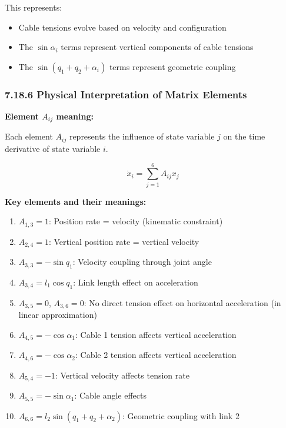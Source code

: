This represents:
\begin{itemize}
    \item Cable tensions evolve based on velocity and configuration
    \item The $\sin \alpha_i$ terms represent vertical components of cable tensions
    \item The $\sin(q_1+q_2+\alpha_i)$ terms represent geometric coupling
\end{itemize}

\subsubsection{7.18.6 Physical Interpretation of Matrix Elements}

\textbf{Element $A_{ij}$ meaning:}

Each element $A_{ij}$ represents the influence of state variable $j$ on the time derivative of state variable $i$.

\begin{equation}
\dot{x}_i = \sum_{j=1}^{6} A_{ij} x_j
\end{equation}

\textbf{Key elements and their meanings:}

\begin{enumerate}
    \item $A_{1,3} = 1$: Position rate = velocity (kinematic constraint)
    
    \item $A_{2,4} = 1$: Vertical position rate = vertical velocity
    
    \item $A_{3,3} = -\sin q_1$: Velocity coupling through joint angle
    
    \item $A_{3,4} = l_1 \cos q_1$: Link length effect on acceleration
    
    \item $A_{3,5} = 0$, $A_{3,6} = 0$: No direct tension effect on horizontal acceleration (in linear approximation)
    
    \item $A_{4,5} = -\cos \alpha_1$: Cable 1 tension affects vertical acceleration
    
    \item $A_{4,6} = -\cos \alpha_2$: Cable 2 tension affects vertical acceleration
    
    \item $A_{5,4} = -1$: Vertical velocity affects tension rate
    
    \item $A_{5,5} = -\sin \alpha_1$: Cable angle effects
    
    \item $A_{6,6} = l_2 \sin(q_1+q_2+\alpha_2)$: Geometric coupling with link 2
\end{enumerate}


